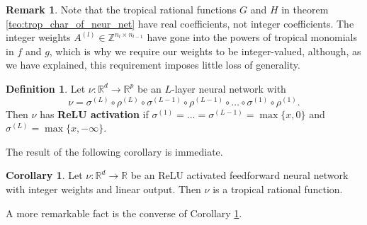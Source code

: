 \documentclass{article}
\theoremstyle{definition}
\newtheorem{corollary}[theorem]{Corollary}
\newtheorem{definition}[theorem]{Definition}
\newtheorem{remark}[theorem]{Remark}
\begin{document}
\begin{remark}\hspace{1sp}\cite{zhang2018tropical}
Note that the tropical rational functions $G$ and $H$ in theorem \ref{teo:trop_char_of_neur_net} have real coefficients, not integer coefficients. The integer weights $A^{(l)} \in \mathbb{Z}^{n_l \times n_{l-1}}$ have gone into the powers of tropical monomials in $f$ and $g$, which is why we require our weights to be integer-valued, although, as we have explained, this requirement imposes little loss of generality.
\end{remark}

\begin{definition}
Let $\nu : \mathbb{R}^{d} \to \mathbb{R}^{p}$ be an $L$-layer neural network with
$$ \nu = \sigma^{(L)} \circ \rho^{(L)} \circ \sigma^{(L-1)} \circ \rho^{(L-1)} \circ \dots \circ \sigma^{(1)} \circ \rho^{(1)}.$$
Then $\nu$ has \textbf{ReLU activation} if 
$\sigma^{(1)} = \dots = \sigma^{(L-1)} = \max\{x, 0 \}$ and $\sigma^{(L)} = \max\{x, -\infty \}$.
\end{definition}
The result of the following corollary is immediate.
\begin{corollary}\hspace{1sp}\cite{zhang2018tropical}
\label{cor:relu_trop_rat_fkt}
Let $\nu : \mathbb{R}^{d} \to \mathbb{R}$ be an ReLU activated feedforward neural network with integer weights and linear output. Then $\nu$ is a tropical rational function.
\end{corollary}

A more remarkable fact is the converse of Corollary \ref{cor:relu_trop_rat_fkt}.
\end{document}
